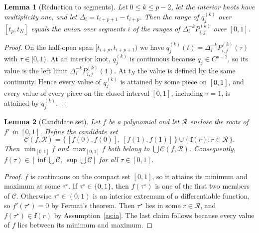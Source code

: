 \documentclass[final,5p,times,twocolumn]{elsarticle}
\newtheorem{lemma}{Lemma}
\theoremstyle{definition}
\newcommand{\iv}[1]{\mathbf{#1}}
\begin{document}
\begin{lemma}[Reduction to segments]\label{lem:segments}
Let $0\le k\le p-2$, let the interior knots have multiplicity one, and let $\Delta_i=t_{i+p+1}-t_{i+p}$. Then the range of $q_j^{(k)}$ over $[t_p,t_N]$ equals the union over segments $i$ of the ranges of $\Delta_i^{-k}P_{i,j}^{(k)}$ over $[0,1]$.
\end{lemma}
\begin{proof}
On the half-open span $[t_{i+p},t_{i+p+1})$ we have $q_j^{(k)}(t)=\Delta_i^{-k}P_{i,j}^{(k)}(\tau)$ with $\tau\in[0,1)$. At an interior knot, $q_j^{(k)}$ is continuous because $q_j\in C^{p-2}$, so its value is the left limit $\Delta_i^{-k}P_{i,j}^{(k)}(1)$. At $t_N$ the value is defined by the same continuity. Hence every value of $q_j^{(k)}$ is attained by some piece on $[0,1]$, and every value of every piece on the closed interval $[0,1]$, including $\tau=1$, is attained by $q_j^{(k)}$.
\end{proof}

\begin{lemma}[Candidate set]\label{lem:candidates}
Let $f$ be a polynomial and let $\mathcal{R}$ enclose the roots of $f'$ in $[0,1]$. Define the candidate set
\begin{equation}
  \mathcal{C}(f,\mathcal{R})=\{\,[f(0),f(0)],\ [f(1),f(1)]\,\}\cup\{\,\iv{f}(r): r\in\mathcal{R}\,\}.
\end{equation}
Then $\min_{[0,1]}f$ and $\max_{[0,1]}f$ both belong to $\bigcup\mathcal{C}(f,\mathcal{R})$. Consequently, $f(\tau)\in[\inf\bigcup\mathcal{C},\ \sup\bigcup\mathcal{C}]$ for all $\tau\in[0,1]$.
\end{lemma}
\begin{proof}
$f$ is continuous on the compact set $[0,1]$, so it attains its minimum and maximum at some $\tau^\star$. If $\tau^\star\in\{0,1\}$, then $f(\tau^\star)$ is one of the first two members of $\mathcal{C}$. Otherwise $\tau^\star\in(0,1)$ is an interior extremum of a differentiable function, so $f'(\tau^\star)=0$ by Fermat's theorem. Then $\tau^\star$ lies in some $r\in\mathcal{R}$, and $f(\tau^\star)\in\iv{f}(r)$ by Assumption~\ref{as:ia}. The last claim follows because every value of $f$ lies between its minimum and maximum.
\end{proof}
\end{document}
